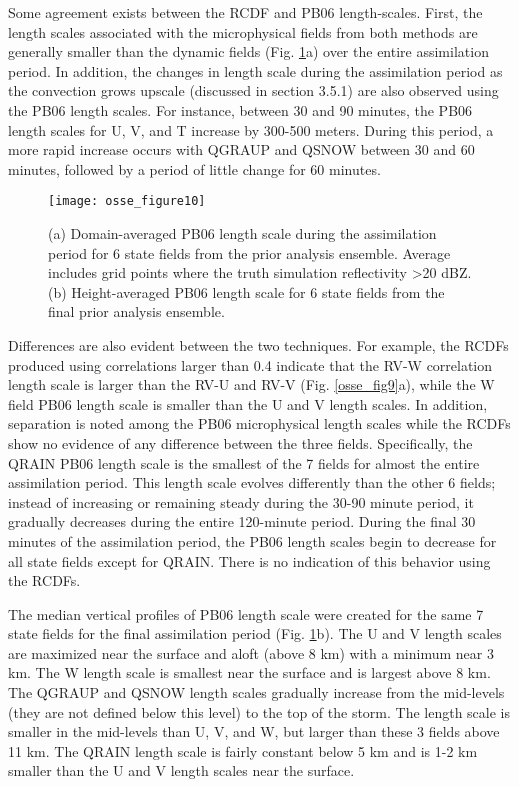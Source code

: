 Some agreement exists between the RCDF and PB06 length-scales. First, the length scales associated with the microphysical fields from both methods are generally smaller than the dynamic fields (Fig. \ref{osse_fig10}a) over the entire assimilation period. In addition, the changes in length scale during the assimilation period as the convection grows upscale (discussed in section 3.5.1) are also observed using the PB06 length scales. For instance, between 30 and 90 minutes, the PB06 length scales for U, V, and T increase by 300-500 meters. During this period, a more rapid increase occurs with QGRAUP and QSNOW between 30 and 60 minutes, followed by a period of little change for 60 minutes. 

\begin{figure}
\centering
\texttt{[image: osse\_figure10]}
\caption{(a) Domain-averaged PB06 length scale during the assimilation period for 6 state fields from the prior analysis ensemble. Average includes grid points where the truth simulation reflectivity \textgreater 20 dBZ. (b) Height-averaged PB06 length scale for 6 state
 fields from the final prior analysis ensemble.}
\label{osse_fig10}
\end{figure}

Differences are also evident between the two techniques. For example, the RCDFs produced using correlations larger than 0.4 indicate that the RV-W correlation length scale is larger than the RV-U and RV-V (Fig. \ref{osse_fig9}a), while the W field PB06 length scale is smaller than the U and V length scales. In addition, separation is noted among the PB06 microphysical length scales while the RCDFs show no evidence of any difference between the three fields. Specifically, the QRAIN PB06 length scale is the smallest of the 7 fields for almost the entire assimilation period. This length scale evolves differently than the other 6 fields; instead of increasing or remaining steady during the 30-90 minute period, it gradually decreases during the entire 120-minute period. During the final 30 minutes of the assimilation period, the PB06 length scales begin to decrease for all state fields except for QRAIN. There is no indication of this behavior using the RCDFs.

The median vertical profiles of PB06 length scale were created for the same 7 state fields for the final assimilation period (Fig. \ref{osse_fig10}b). The U and V length scales are maximized near the surface and aloft (above 8 km) with a minimum near 3 km. The W length scale is smallest near the surface and is largest above 8 km. The QGRAUP and QSNOW length scales gradually increase from the mid-levels (they are not defined below this level) to the top of the storm. The length scale is smaller in the mid-levels than U, V, and W, but larger than these 3 fields above 11 km. The QRAIN length scale is fairly constant below 5 km and is 1-2 km smaller than the U and V length scales near the surface.

